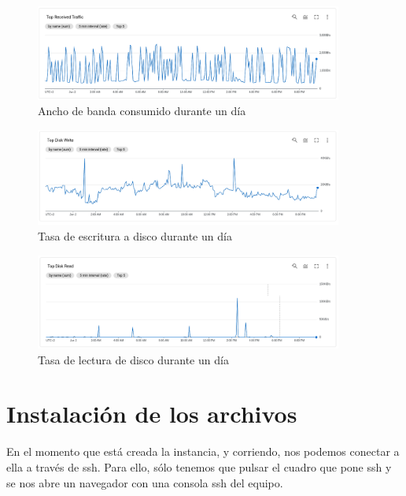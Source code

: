 \documentclass[11pt,spanish,listoffigures,listoftables]{tfgetsinf}
\begin{document}
 \begin{figure}[H] %
  \centering
   \includegraphics[width=0.90\textwidth]{img/usonet.png}
   \caption{Ancho de banda consumido durante un día}
   \label{fig:cargalanweb}
 \end{figure}

 \begin{figure}[H] %
  \centering
   \includegraphics[width=0.90\textwidth]{img/usodisco.png}
   \caption{Tasa de escritura a disco durante un día}
   \label{fig:cargawhdweb}
 \end{figure}

 \begin{figure}[H] %
  \centering
   \includegraphics[width=0.90\textwidth]{img/usodiscoread.png}
   \caption{Tasa de lectura de disco durante un día}
   \label{fig:cargarhdweb}
 \end{figure}

\section{Instalación de los archivos}

En el momento que está creada la instancia, y corriendo, nos podemos conectar a ella a través de ssh. Para ello, sólo tenemos que pulsar el cuadro que pone ssh y se nos abre un navegador con una consola ssh del equipo.
\end{document}
